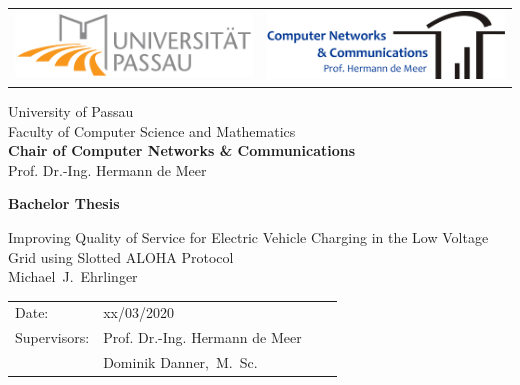 \documentclass[fontsize=12pt,openright,twoside,paper=a4,BCOR=1cm]{scrbook}
\newcommand{\authornamefirst}{Michael}
\newcommand{\authornamemiddle}{J.}
\newcommand{\authornamelast}{Ehrlinger}
\newcommand{\worktitle}{Improving Quality of Service for Electric Vehicle Charging in the Low Voltage Grid using Slotted ALOHA Protocol}
\newcommand{\thesistype}{Bachelor Thesis}
\newcommand{\thesisdate}{xx/03/2020}
\newcommand{\thesisprof}{Prof. Dr.-Ing. Hermann de Meer}
\newcommand{\supervisor}{Dominik Danner,~M.~Sc.}
\newcommand{\chair}{Chair of Computer Networks \& Communications}
\begin{document}
\thispagestyle{empty}
\newpage

\vspace{1cm}

\begin{center}
\begin{tabular}{lr}
\includegraphics[width=6.5cm]{img/logouni.pdf}
&
\includegraphics[width=6.5cm]{img/logochair.pdf}
\end{tabular}

\vspace{3cm}
\Large University of Passau
\\
\Large Faculty of Computer Science and Mathematics
\\
\vspace{0.3cm}
\Large {\bf \chair }
\\
\Large \thesisprof

\end{center}


\vspace{4.5cm}

\begin{center}
        {\bf\Huge \thesistype} %
\end{center}

\begin{center}
        \settowidth{\baselineskip}{0.4cm}
        {\LARGE \worktitle}
        \\
        {\Large
        \authornamefirst~\authornamemiddle~\authornamelast
        }
\end{center}

\vfill {%

\vfill


{\large
\begin{tabular}[l]{llll}

Date:       & \thesisdate %
\smallskip \\
Supervisors:   & \thesisprof \\
	& \supervisor \\
\end{tabular}}
} \cleardoublepage
\end{document}
